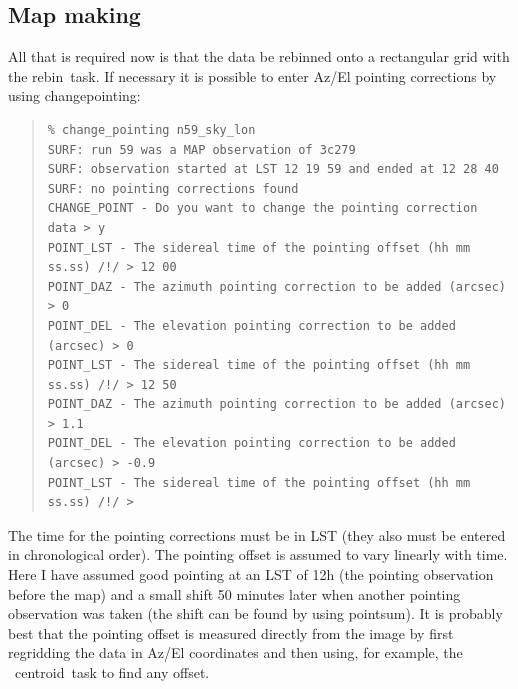 \documentclass[twoside,11pt]{article}
\newcommand{\Kappa}{\xref{{\sc{Kappa}}}{sun95}{}}
\newcommand{\task}[1]{{\sf #1}}
\newcommand{\rebin}{\htmlref{\task{rebin}}{REBIN}}
\newcommand{\chgpnt}{\htmlref{\task{change\_pointing}}{CHANGE_POINTING}}
\newcommand{\pointsum}{\htmlref{\task{pointsum}}{POINTSUM}}
\newcommand{\centroid}{\xref{\task{centroid}}{sun95}{CENTROID}}
\newenvironment{myquote}{\begin{quote}\begin{small}}{\end{small}\end{quote}}
\newcommand{\htmlref}[2]{#1}
\newcommand{\xref}[3]{#1}
\renewcommand{\_}{\texttt{\symbol{95}}}
\begin{document}
\subsection{Map making}

All that is required now is that the data be rebinned onto a rectangular grid
with the \rebin\ task. If necessary it is possible to enter Az/El pointing
corrections by using \chgpnt:

\begin{myquote}
\begin{verbatim}
% change_pointing n59_sky_lon
SURF: run 59 was a MAP observation of 3c279
SURF: observation started at LST 12 19 59 and ended at 12 28 40
SURF: no pointing corrections found
CHANGE_POINT - Do you want to change the pointing correction data > y
POINT_LST - The sidereal time of the pointing offset (hh mm ss.ss) /!/ > 12 00
POINT_DAZ - The azimuth pointing correction to be added (arcsec) > 0
POINT_DEL - The elevation pointing correction to be added (arcsec) > 0
POINT_LST - The sidereal time of the pointing offset (hh mm ss.ss) /!/ > 12 50
POINT_DAZ - The azimuth pointing correction to be added (arcsec) > 1.1
POINT_DEL - The elevation pointing correction to be added (arcsec) > -0.9
POINT_LST - The sidereal time of the pointing offset (hh mm ss.ss) /!/ > 
\end{verbatim}
\end{myquote}
The time for the pointing corrections must be in LST (they also must be
entered in chronological order). The pointing offset is assumed to vary
linearly with time. Here I have assumed good pointing at an LST of 12h
(the pointing observation before the map) and a small shift 50 minutes
later when another pointing observation was taken (the shift can be found
by using \pointsum). It is probably best that the pointing offset is 
measured directly from the image by first regridding the data in 
Az/El coordinates and then using, for example, the \Kappa\ \centroid\
task to find any offset.
\end{document}
